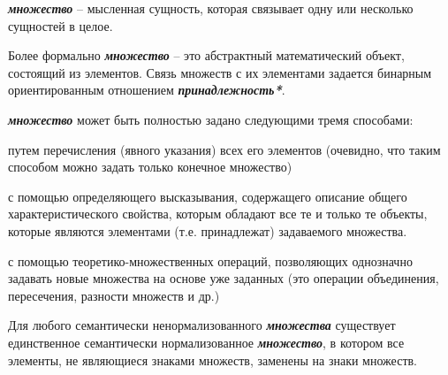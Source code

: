 \begin{SCn}
{    \textbf{\textit{множество}} – мысленная сущность, которая связывает одну или несколько сущностей в целое.

    Более формально \textbf{\textit{множество}} – это абстрактный математический объект, состоящий из элементов. Связь множеств с их элементами задается бинарным ориентированным отношением \textbf{\textit{принадлежность*}}.

    \textbf{\textit{множество}} может быть полностью задано следующими тремя способами:
        \begin{scnitemize}
            \item путем перечисления (явного указания) всех его элементов (очевидно, что таким способом можно задать только конечное множество)
            \item с помощью определяющего высказывания, содержащего описание общего характеристического свойства, которым обладают все те и только те объекты, которые являются элементами (т.е. принадлежат) задаваемого множества.
            \item с помощью теоретико-множественных операций, позволяющих однозначно задавать новые множества на основе уже заданных (это операции объединения, пересечения, разности множеств и др.)
        \end{scnitemize}
        Для любого семантически ненормализованного \textbf{\textit{множества}} существует единственное семантически нормализованное \textbf{\textit{множество}}, в котором все элементы, не являющиеся знаками множеств, заменены на знаки множеств.}





\end{SCn}
